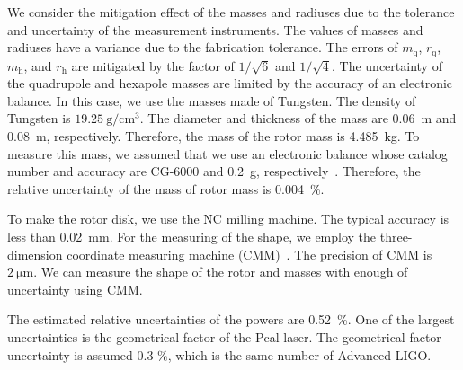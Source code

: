 \documentclass[A4]{spie}  %
\begin{document}
 We consider the mitigation effect of the masses and radiuses due to the tolerance and uncertainty of the measurement instruments. The values of masses and radiuses have a variance due to the fabrication tolerance. The errors of $m_{\mathrm{q}}$, $r_{\mathrm{q}}$, $m_{\mathrm{h}}$, and $r_{\mathrm{h}}$ are mitigated by the factor of $1/\sqrt{6}$ and $1/\sqrt{4}$. 
The uncertainty of the quadrupole and hexapole masses are limited by the accuracy of  an electronic balance. In this case, we use the masses made of Tungsten. The density of Tungsten is $19.25~\mathrm{g/cm^3}$. The diameter and thickness of the mass are 0.06~m and 0.08~m, respectively. Therefore, the mass of the rotor mass is 4.485~kg. To measure this mass, we assumed that we use an electronic balance whose catalog number and accuracy are CG-6000 and 0.2~g, respectively~\cite{CG6000}. Therefore, the relative uncertainty of the mass of rotor mass is 0.004~\%.

 To make the rotor disk, we use the NC milling machine. The typical accuracy is less than 0.02~mm. For the measuring of the shape, we employ the three-dimension coordinate measuring machine (CMM)~\cite{Inoue:16}. The precision of CMM is $2~\mathrm{\mu m}$. We can measure the shape of the rotor and masses with enough of uncertainty using CMM. 

The estimated relative uncertainties of the powers are 0.52~\%. One of the largest uncertainties is the geometrical factor of the Pcal laser. The geometrical factor uncertainty is assumed 0.3 \%, which is the same number of Advanced LIGO. 
\end{document}
